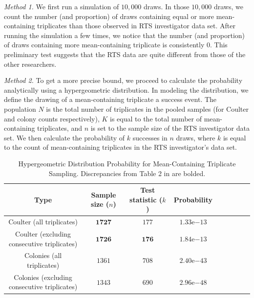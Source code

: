 \documentclass[11pt]{article}
\newcommand{\expnum}[2]{{#1}\mathrm{e}{#2}}
\begin{document}
{\em Method 1.} We first run a simulation of $10,000$ draws. In those $10,000$ draws, we count the number (and proportion) of draws containing equal or more mean-containing triplicates than those observed in RTS investigator data set. After running the simulation a few times, we notice that the number (and proportion) of draws containing more mean-containing triplicate is consistently $0$. This preliminary test suggests that the RTS data are quite different from those of the other researchers.

{\em Method 2.} To get a more precise bound, we proceed to calculate the probability analytically using a hypergeometric distribution. In modeling the distribution, we define the drawing of a mean-containing triplicate a success event. The population $N$ is the total number of triplicates in the pooled samples (for Coulter and colony counts respectively), $K$ is equal to the total number of mean-containing triplicates, and $n$ is set to the sample size of the RTS investigator data set. We then calculate the probability of $k$ successes in $n$ draws, where $k$ is equal to the count of mean-containing triplicates in the RTS investigator's data set.

\begin{table}[htbp]
\begin{center}
\begin{scriptsize}
\bgroup
\def\arraystretch{1.5} %
\begin{tabular}{*{9}{c}}
\hline
\textbf{Type} & \textbf{Sample size ($n$)} & \textbf{Test statistic ($k$)} & \textbf{Probability} \\

\hline
Coulter (all triplicates) & $\bm{1727}$ & $177$ & $\expnum{1.33}{-13}$\\

Coulter (excluding consecutive triplicates) & $\bm{1726}$ & $\bm{176}$ & $\expnum{1.84}{-13}$\\

Colonies (all triplicates) & $1361$ & $708$ & $\expnum{2.40}{-43}$\\

Colonies (excluding consecutive triplicates) & $1343$ & $690$ & $\expnum{2.96}{-48}$\\
\hline
\end{tabular}
\egroup
\end{scriptsize}
\end{center}
\caption{Hypergeometric Distribution Probability for Mean-Containing Triplicate Sampling. Discrepancies from Table 2 in \citet{Pitt:2016cu} are bolded.}
\label{tbl:hypergeom}
\end{table}
\end{document}
